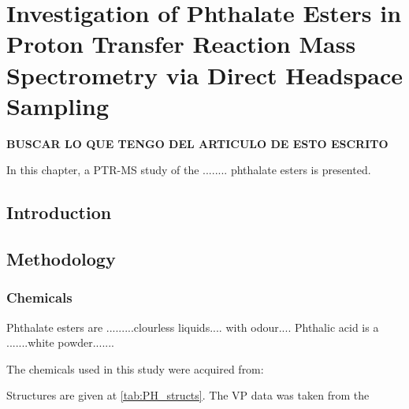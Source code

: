 \chapter{Investigation of Phthalate Esters in Proton Transfer Reaction Mass Spectrometry via Direct Headspace Sampling}

\textbf{BUSCAR LO QUE TENGO DEL ARTICULO DE ESTO ESCRITO}






In this chapter, a PTR-MS study of the ........ phthalate esters is presented.


\section{Introduction}




\section{Methodology}

\subsection{Chemicals}
Phthalate esters are .........clourless liquids.... with odour....
Phthalic acid is a .......white powder.......


The chemicals used in this study were acquired from:


Structures are given at \autoref{tab:PH_structs}. The VP data was taken from the \citeauthor{USAEPA}




